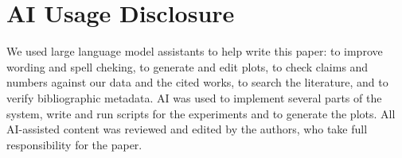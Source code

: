 \section*{AI Usage Disclosure}

We used large language model assistants to help
write this paper: to improve wording and spell cheking, to generate and edit plots, to check claims and
numbers against our data and the cited works, to search the literature,
and to verify bibliographic metadata. AI was used to implement several parts of the system, write and run scripts for the experiments and to generate the plots.
All AI-assisted content was reviewed and edited by the authors, who take
full responsibility for the paper.
